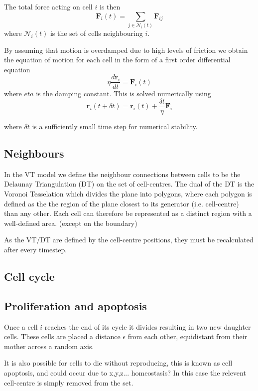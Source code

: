 \documentclass[a4paper]{article}
\begin{document}
The total force acting on cell $i$ is then
\begin{equation}
	\mathbf{F}_i(t)= \sum_{j \in \mathcal{N}_i(t)}\mathbf{F}_{ij}
\end{equation}
where $\mathcal{N}_i(t)$ is the set of cells neighbouring $i$.

By assuming that motion is overdamped due to high levels of friction we obtain the equation of motion for each cell in the form of a first order differential equation
\begin{equation}
	\eta \frac{d\mathbf{r}_i}{dt}= \mathbf{F}_i(t)
\end{equation}
where $eta$ is the damping constant. This is solved numerically using
\begin{equation}
	\mathbf{r}_i(t+\delta t)= \mathbf{r}_i(t)+\frac{\delta t}{\eta} \mathbf{F}_i
\end{equation}

where $\delta t$ is a sufficiently small time step for numerical stability.
\subsection{Neighbours}
In the VT model we define the neighbour connections between cells to be the Delaunay Triangulation (DT) on the set of cell-centres. The dual of the DT is the Voronoi Tesselation which divides the plane into polygons, where each polygon is defined as the the region of the plane closest to its generator (i.e. cell-centre) than any other. Each cell can therefore be represented as a distinct region with a well-defined area. (except on the boundary) 

As the VT/DT are defined by the cell-centre positions, they must be recalculated after every timestep.

\subsection{Cell cycle}

\subsection{Proliferation and apoptosis}
Once a cell $i$ reaches the end of its cycle it divides resulting in two new daughter cells. These cells are placed a distance $\epsilon$ from each other, equidistant from their mother across a random axis. 

It is also possible for cells to die without reproducing, this is known as cell apoptosis, and could occur due to x,y,z... homeostasis? In this case the relevent cell-centre is simply removed from the set.
\end{document}
